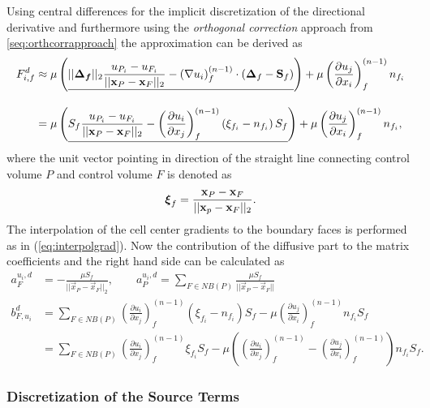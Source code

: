 Using central differences for the implicit discretization of the directional derivative and furthermore using the \emph{orthogonal correction} approach from \ref{seq:orthcorrapproach} the approximation can be derived as
\begin{align*}
  F_{i,f}^d 
  &\approx 
  \mu \left( \underline{||\boldsymbol{\boldsymbol{\Delta}_f}||_2 \frac{u_{P_i} - u_{F_i}}{ || \mathbf{x}_P - \mathbf{x}_F ||_2 }  
  -  \left(\nabla u_i \right)_f^{(n-1)} \cdot \left(\boldsymbol{\Delta}_f - \mathbf{S}_f\right)  }  \right)
  + \mu \left( \frac{\partial u_j}{\partial x_i} \right)_f^{(n-1)} n_{f_i} \\[1em]
  &= \mu \left(\underline{  S_f \frac{u_{P_i} - u_{F_i}}{ || \mathbf{x}_P - \mathbf{x}_F ||_2 }  
  - \left( \frac{\partial u_i}{\partial x_j}\right)_f^{(n-1)} \left(\xi_{f_i} - n_{f_i}\right)S_f  } \right)
  + \mu \left( \frac{\partial u_j}{\partial x_i} \right)_f^{(n-1)} n_{f_i},
\end{align*}
where the unit vector pointing in direction of the straight line connecting control volume \(P\) and control volume \(F\) is denoted as
\begin{displaymath}
  \boldsymbol{\xi}_f = \frac{\mathbf{x}_P - \mathbf{x}_F}{|| \mathbf{x}_p - \mathbf{x}_F ||_2}.
\end{displaymath}
The interpolation of the cell center gradients to the boundary faces is performed as in (\ref{eq:interpolgrad}). Now the contribution of the diffusive part to the matrix coefficients and the right hand side can be calculated as
\begin{subequations}
\begin{align}
  a_F^{u_i,d} &= - \frac{\mu S_f}{||\vec{x}_P - \vec{x}_F||_2}, 
  \quad \quad a_P^{u_i,d} = \sum_{F \in NB(P)} \frac{\mu S_f}{|| \vec{x}_P - \vec{x}_F ||} \\[1em]
  b_{F,u_i}^d &=  \sum_{F \in NB(P)} \left( \frac{\partial u_i}{\partial x_j}\right)_f^{(n-1)} \left(\xi_{f_i} - n_{f_i}\right)S_f  
  - \mu \left( \frac{\partial u_j}{\partial x_i} \right)_f^{(n-1)} n_{f_i} S_f   \nonumber \\[0.5em]
  &=  \sum_{F \in NB(P)} \left( \frac{\partial u_i}{\partial x_j}\right)_f^{(n-1)} \xi_{f_i} S_f
  - \mu \left( \left( \frac{\partial u_i}{\partial x_j} \right)_f^{(n-1)}
  - \left( \frac{\partial u_j}{\partial x_i} \right)_f^{(n-1)} \right) n_{f_i} S_f.
\end{align}
\end{subequations}

\subsubsection{Discretization of the Source Terms}

